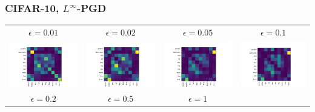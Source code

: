 \documentclass[10pt,usepdftitle=false,aspectratio=169]{beamer}
\begin{document}
\begin{frame}
	\frametitle{CIFAR-10, $L^\infty$-PGD}
	\begin{tabular}{cccc}
		
		$\epsilon = 0.01$  & 	$\epsilon = 0.02$ & 	$\epsilon = 0.05$ & 	$\epsilon = 0.1$ \\
		
		\includegraphics[align=c,width=0.3\columnwidth]{../code/results/CIFAR-10/figures/LinfPGD, epsilon=0.01.png} &
		\includegraphics[align=c,width=0.3\columnwidth]{../code/results/CIFAR-10/figures/LinfPGD, epsilon=0.02.png} &
		\includegraphics[align=c,width=0.3\columnwidth]{../code/results/CIFAR-10/figures/LinfPGD, epsilon=0.05.png} &
		\includegraphics[align=c,width=0.3\columnwidth]{../code/results/CIFAR-10/figures/LinfPGD, epsilon=0.1.png} 
		\bigskip \\
		
		$\epsilon = 0.2$  & 	$\epsilon = 0.5$ & 	$\epsilon = 1$ & \\
		

\end{tabular}
\end{frame}
\end{document}
